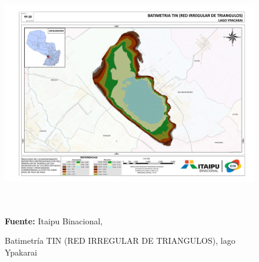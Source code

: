 \begin{appendices}
\begin{figure}[ht]
    \centering
    \includegraphics[width=150mm, height=100mm]{Imagenes/cap3/Batimetria_lago_Ypacarai_TIN_A3.pdf}
    \caption[BATIMETRIA TIN lago Ypakarai]{Batimetr\'ia TIN (RED IRREGULAR DE TRIANGULOS), lago Ypakarai} 
    \textbf{Fuente: }Itaipu Binacional, \cite{itaipu-binacional-2014}
    \label{fig:ModuloFrontal}
\end{figure}


\end{appendices}
